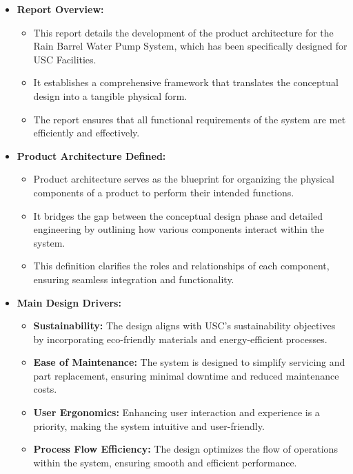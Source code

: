 \documentclass[12pt]{report}
\begin{document}
\begin{itemize}
    \item \textbf{Report Overview:}
    \begin{itemize}
        \item This report details the development of the product architecture for the Rain Barrel Water Pump System, which has been specifically designed for USC Facilities.
        \item It establishes a comprehensive framework that translates the conceptual design into a tangible physical form.
        \item The report ensures that all functional requirements of the system are met efficiently and effectively.
    \end{itemize}
    
    \item \textbf{Product Architecture Defined:}
    \begin{itemize}
        \item Product architecture serves as the blueprint for organizing the physical components of a product to perform their intended functions.
        \item It bridges the gap between the conceptual design phase and detailed engineering by outlining how various components interact within the system.
        \item This definition clarifies the roles and relationships of each component, ensuring seamless integration and functionality.
    \end{itemize}
    
    \item \textbf{Main Design Drivers:}
    \begin{itemize}
        \item \textbf{Sustainability:} The design aligns with USC's sustainability objectives by incorporating eco-friendly materials and energy-efficient processes.
        \item \textbf{Ease of Maintenance:} The system is designed to simplify servicing and part replacement, ensuring minimal downtime and reduced maintenance costs.
        \item \textbf{User Ergonomics:} Enhancing user interaction and experience is a priority, making the system intuitive and user-friendly.
        \item \textbf{Process Flow Efficiency:} The design optimizes the flow of operations within the system, ensuring smooth and efficient performance.
    \end{itemize}
    

\end{itemize}
\end{document}
